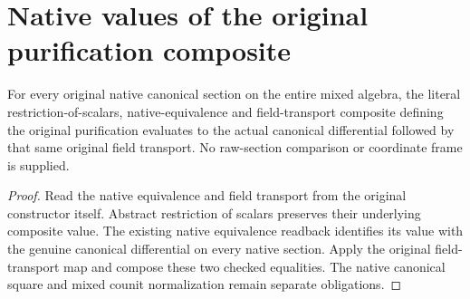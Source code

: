\section{Native values of the original purification composite}

\begin{lemma}
\label{lem:kn-mixed-original-native-value}
\leanok
For every original native canonical section on the entire mixed algebra,
the literal restriction-of-scalars, native-equivalence and field-transport
composite defining the original purification evaluates to the actual
canonical differential followed by that same original field transport.
No raw-section comparison or coordinate frame is supplied.
\end{lemma}
\begin{proof}
Read the native equivalence and field transport from the original
constructor itself. Abstract restriction of scalars preserves their
underlying composite value. The existing native equivalence readback
identifies its value with the genuine canonical differential on every
native section. Apply the original field-transport map and compose these
two checked equalities. The native canonical square and mixed counit
normalization remain separate obligations.
\end{proof}

